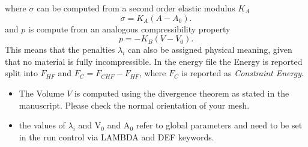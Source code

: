 \documentclass[11pt]{article}
\begin{document}
where $\sigma$ can be computed from a second order elastic modulus $K_A$
\begin{equation}
  \sigma  =  K_A(A-A_0).
\end{equation}
and $p$ is compute from an analogous compressibility property
\begin{equation}
  p  =  -K_B(V-V_0).
\end{equation}
This means that the penalties $\lambda_i$ can also be assigned physical meaning, given that no material is fully incompressible. In the energy file the Energy is reported split into $F_{HF}$ and $F_{C} = F_{CHF}-F_{HF} $, where $F_C$ is reported as \textit{Constraint Energy}. \\
\noindent
\begin{tcolorbox}[colback=orange!5!white,colframe=orange!75!black,title=Clarification]
\begin{itemize}
    \item The Volume $V$ is computed using the divergence theorem as stated in the manuscript. Please check the normal orientation of your mesh.  
    \item the values of $\lambda_i$ and V$_0$ and A$_0$ refer to global parameters and need to be set in the run control via LAMBDA and DEF keywords.
    \end{itemize}

\end{tcolorbox}
\end{document}
